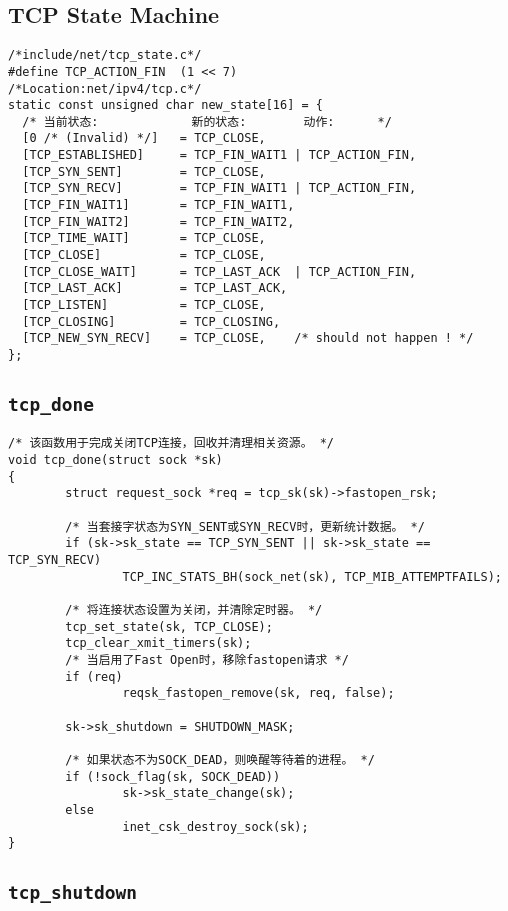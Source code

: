         \subsection{TCP State Machine}

\begin{verbatim}
/*include/net/tcp_state.c*/
#define TCP_ACTION_FIN  (1 << 7)
/*Location:net/ipv4/tcp.c*/
static const unsigned char new_state[16] = {
  /* 当前状态:             新的状态:        动作:      */
  [0 /* (Invalid) */]   = TCP_CLOSE,
  [TCP_ESTABLISHED]     = TCP_FIN_WAIT1 | TCP_ACTION_FIN,
  [TCP_SYN_SENT]        = TCP_CLOSE,
  [TCP_SYN_RECV]        = TCP_FIN_WAIT1 | TCP_ACTION_FIN,
  [TCP_FIN_WAIT1]       = TCP_FIN_WAIT1,
  [TCP_FIN_WAIT2]       = TCP_FIN_WAIT2,
  [TCP_TIME_WAIT]       = TCP_CLOSE,
  [TCP_CLOSE]           = TCP_CLOSE,
  [TCP_CLOSE_WAIT]      = TCP_LAST_ACK  | TCP_ACTION_FIN,
  [TCP_LAST_ACK]        = TCP_LAST_ACK,
  [TCP_LISTEN]          = TCP_CLOSE,
  [TCP_CLOSING]         = TCP_CLOSING,
  [TCP_NEW_SYN_RECV]    = TCP_CLOSE,    /* should not happen ! */
};
\end{verbatim}
    \subsection{\texttt{tcp_done}}
\begin{verbatim}
/* 该函数用于完成关闭TCP连接，回收并清理相关资源。 */
void tcp_done(struct sock *sk)
{
        struct request_sock *req = tcp_sk(sk)->fastopen_rsk;

        /* 当套接字状态为SYN_SENT或SYN_RECV时，更新统计数据。 */
        if (sk->sk_state == TCP_SYN_SENT || sk->sk_state == TCP_SYN_RECV)
                TCP_INC_STATS_BH(sock_net(sk), TCP_MIB_ATTEMPTFAILS);

        /* 将连接状态设置为关闭，并清除定时器。 */
        tcp_set_state(sk, TCP_CLOSE);
        tcp_clear_xmit_timers(sk);
        /* 当启用了Fast Open时，移除fastopen请求 */
        if (req)
                reqsk_fastopen_remove(sk, req, false);

        sk->sk_shutdown = SHUTDOWN_MASK;

        /* 如果状态不为SOCK_DEAD，则唤醒等待着的进程。 */
        if (!sock_flag(sk, SOCK_DEAD))
                sk->sk_state_change(sk);
        else
                inet_csk_destroy_sock(sk);
}
\end{verbatim}
    \subsection{\texttt{tcp_shutdown}}

